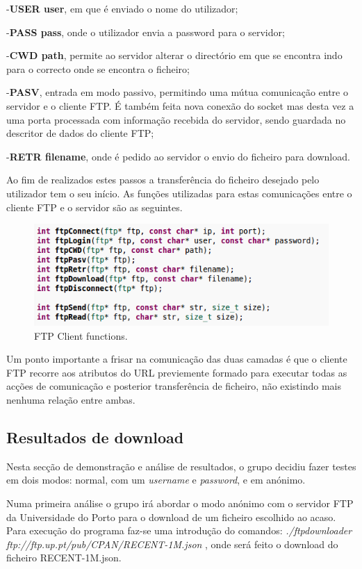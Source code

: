 \documentclass[a4paper]{article}
\begin{document}
 -\textbf{USER user}, em que é enviado o nome do utilizador;
 
 -\textbf{PASS pass}, onde o utilizador envia a password para o servidor;
 
 -\textbf{CWD path}, permite ao servidor alterar o directório em que se encontra indo para o correcto onde se encontra o ficheiro;
 
 -\textbf{PASV}, entrada em modo passivo, permitindo uma mútua comunicação entre o servidor e o cliente FTP. É também feita nova conexão do socket mas desta vez a uma porta processada com informação recebida do servidor, sendo guardada no descritor de dados do cliente FTP;
 
 -\textbf{RETR filename}, onde é pedido ao servidor o envio do ficheiro para download.
 
Ao fim de realizados estes passos a transferência do ficheiro desejado pelo utilizador tem o seu início. As funções utilizadas para estas comunicações entre o cliente FTP e o servidor são as seguintes.

\begin{figure}[h!]
\centering
\includegraphics[scale=0.5]{res/ftp-functions.png}
\caption{FTP Client functions.}
\end{figure}

Um ponto importante a frisar na comunicação das duas camadas é que o cliente FTP recorre aos atributos do URL previemente formado para executar todas as acções de comunicação e posterior transferência de ficheiro, não existindo mais nenhuma relação entre ambas.

\subsection{Resultados de download}
Nesta secção de demonstração e análise de resultados, o grupo decidiu fazer testes em dois modos: normal, com um \textit{username} e \textit{password}, e em anónimo.

Numa primeira análise o grupo irá abordar o modo anónimo com o servidor FTP da Universidade do Porto para o download de um ficheiro escolhido ao acaso.
Para execução do programa faz-se uma introdução do comandos:
\textit{./ftpdownloader ftp://ftp.up.pt/pub/CPAN/RECENT-1M.json} , onde será feito o download do ficheiro RECENT-1M.json.
\end{document}
